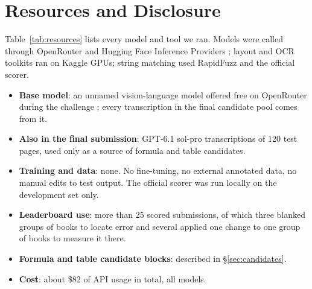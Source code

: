 \documentclass[11pt]{article}
\begin{document}
\section{Resources and Disclosure}
\label{sec:resources}
Table~\ref{tab:resources} lists every model and tool we ran. Models were called through OpenRouter \citep{openrouter} and Hugging Face Inference Providers \citep{hfinference}; layout and OCR toolkits ran on Kaggle GPUs; string matching used RapidFuzz \citep{rapidfuzz} and the official scorer.
\begin{itemize}
  \setlength\itemsep{0pt}
  \item \textbf{Base model}: an unnamed vision-language model offered free on OpenRouter during the challenge \citep{stealthmodel}; every transcription in the final candidate pool comes from it.
  \item \textbf{Also in the final submission}: GPT-6.1 sol-pro transcriptions of 120 test pages, used only as a source of formula and table candidates.
  \item \textbf{Training and data}: none. No fine-tuning, no external annotated data, no manual edits to test output. The official scorer was run locally on the development set only.
  \item \textbf{Leaderboard use}: more than 25 scored submissions, of which three blanked groups of books to locate error and several applied one change to one group of books to measure it there.
  \item \textbf{Formula and table candidate blocks}: described in \S\ref{sec:candidates}.
  \item \textbf{Cost}: about \$82 of API usage in total, all models.
\end{itemize}
\end{document}
